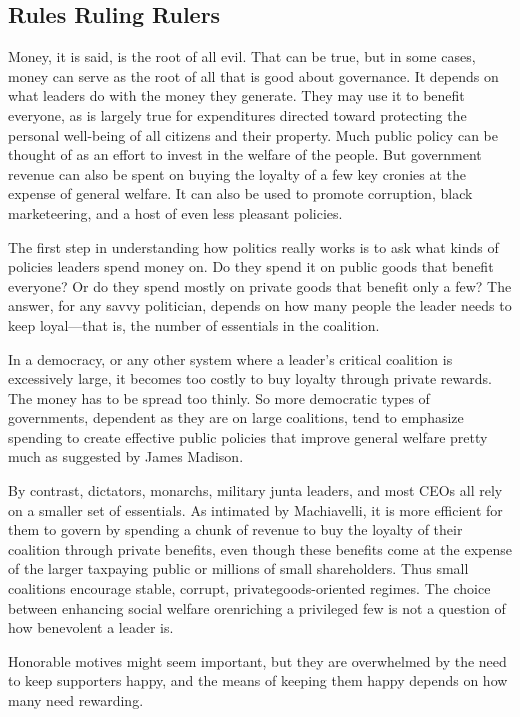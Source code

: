 \documentclass[10pt]{article}
\begin{document}
\subsection{Rules Ruling Rulers}

{\large Money, it is said, is the root of all evil. That can be true, but in
some cases, money can serve as the root of all that is good about governance. It
depends on what leaders do with the money they generate. They may use it to
benefit everyone, as is largely true for expenditures directed toward protecting
the personal well-being of all citizens and their property. Much public policy
can be thought of as an effort to invest in the welfare of the people. But
government revenue can also be spent on buying the loyalty of a few key cronies
at the expense of general welfare. It can also be used to promote corruption,
black marketeering, and a host of even less pleasant policies.}

{\large The first step in understanding how politics really works is to ask what
kinds of policies leaders spend money on. Do they spend it on public goods that
benefit everyone? Or do they spend mostly on private goods that benefit only a
few? The answer, for any savvy politician, depends on how many people the leader
needs to keep loyal---that is, the number of essentials in the coalition.}

{\large In a democracy, or any other system where a leader's critical coalition
is excessively large, it becomes too costly to buy loyalty through private
rewards. The money has to be spread too thinly. So more democratic types of
governments, dependent as they are on large coalitions, tend to emphasize
spending to create effective public policies that improve general welfare pretty
much as suggested by James Madison.}

{\large By contrast, dictators, monarchs, military junta leaders, and most CEOs
all rely on a smaller set of essentials. As intimated by Machiavelli, it is more
efficient for them to govern by spending a chunk of revenue to buy the loyalty of
their coalition through private benefits, even though these benefits come at the
expense of the larger taxpaying public or millions of small shareholders. Thus
small coalitions encourage stable, corrupt, privategoods-oriented regimes. The
choice between enhancing social welfare orenriching a privileged few is not a
question of how benevolent a leader is.}

{\large Honorable motives might seem important, but they are overwhelmed by the
need to keep supporters happy, and the means of keeping them happy depends on how
many need rewarding.}
\end{document}
